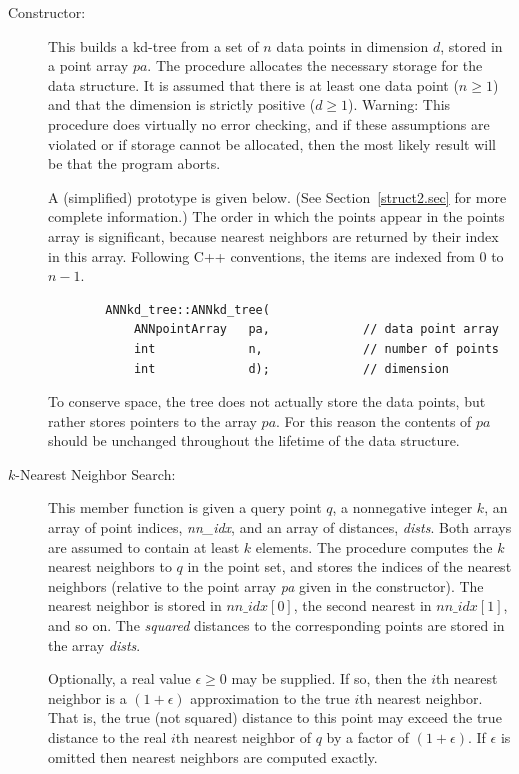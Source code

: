 \documentclass[11pt]{article}		%
\begin{document}
\begin{description}
\item[Constructor:] This builds a kd-tree from a set of $n$ data points
	in dimension $d$, stored in a point array $pa$.  The procedure
	allocates the necessary storage for the data structure.  It is
	assumed that there is at least one data point ($n \ge 1$) and
	that the dimension is strictly positive ($d \ge 1$).  Warning:
	This procedure does virtually no error checking, and if these
	assumptions are violated or if storage cannot be allocated, then
	the most likely result will be that the program aborts.
	
	A (simplified) prototype is given below.  (See
	Section~\ref{struct2.sec} for more complete information.)  The order
	in which the points appear in the points array is significant,
	because nearest neighbors are returned by their index in this array.
	Following C++ conventions, the items are indexed from 0 to $n-1$.
	{\small \begin{verbatim}
	    ANNkd_tree::ANNkd_tree(
	        ANNpointArray   pa,             // data point array
	        int             n,              // number of points
	        int             d);             // dimension
	\end{verbatim} }

	To conserve space, the tree does not actually store the data
	points, but rather stores pointers to the array $pa$.  For this
	reason the contents of $pa$ should be unchanged throughout the
	lifetime of the data structure.

\item[$k$-Nearest Neighbor Search:] This member function is given a
	query point $q$, a nonnegative integer $k$, an array of point
	indices, \textit{nn\_idx}, and an array of distances,
	\textit{dists}.  Both arrays are assumed to contain at least $k$
	elements.  The procedure computes the $k$ nearest neighbors to $q$
	in the point set, and stores the indices of the nearest neighbors
	(relative to the point array \textit{pa} given in the constructor).
	The nearest neighbor is stored in $\textit{nn\_idx}[0]$, the second
	nearest in $\textit{nn\_idx}[1]$, and so on.  The \emph{squared}
	distances to the corresponding points are stored in the array
	\textit{dists}.

	Optionally, a real value $\epsilon \ge 0$ may be supplied.  If so,
	then the $i$th nearest neighbor is a $(1+\epsilon)$ approximation
	to the true $i$th nearest neighbor.  That is, the true (not squared)
	distance to this point may exceed the true distance to the real
	$i$th nearest neighbor of $q$ by a factor of $(1+\epsilon)$.  If
	$\epsilon$ is omitted then nearest neighbors are computed exactly.


\end{description}
\end{document}
